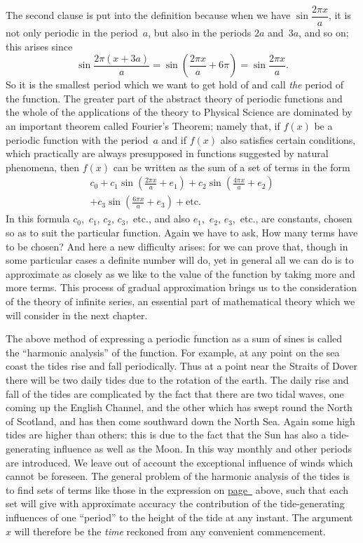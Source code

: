 \documentclass[12pt,leqno]{book}[2005/09/16]
\newcommand{\Pagelabel}[2][page]{\phantomsection\label{#1:#2}}
\newcommand{\Pageref}[2][p.]{\hyperref[page:#2]{#1~\pageref*{page:#2}}}
\newcommand{\PageSep}[1]{\ignorespaces}
\begin{document}
The second clause is put into the definition
because when we have $\sin \dfrac{2\pi x}{a}$, it is not only
periodic in the period~$a$, but also in the periods
$2a$ and~$3a$, and so on; this arises since
\[
\sin \frac{2\pi (x + 3a)}{a}
  = \sin \left(\frac{2\pi x}{a} + 6\pi\right)
  = \sin \frac{2\pi x}{a}.
\]
So it is the smallest period which we want to
get hold of and call \emph{the} period of the function.
The greater part of the abstract theory of
periodic functions and the whole of the applications
of the theory to Physical Science are
dominated by an important theorem called
Fourier's Theorem; namely that, if $f(x)$ be a
%
periodic function with the period~$a$ and if $f(x)$
also satisfies certain conditions, which practically
are always presupposed in functions suggested
by natural phenomena, then $f(x)$ can
be written as the sum of a set of terms in the
form\Pagelabel{191}
\begin{multline*}
c_{0} + c_{1} \sin \left(\frac{2\pi x}{a} + e_{1}\right)
  + c_{2} \sin \left(\frac{4\pi x}{a} + e_{2}\right) \\
  + c_{3} \sin \left(\frac{6\pi x}{a} + e_{3}\right) + \text{etc.}
\end{multline*}
\PageSep{192}
In this formula $c_{0}$,~$c_{1}$, $c_{2}$, $c_{3}$,~etc., and also
$e_{1}$,~$e_{2}$, $e_{3}$,~etc., are constants, chosen so as to
suit the particular function. Again we have
to ask, How many terms have to be chosen?
And here a new difficulty arises: for we can
prove that, though in some particular cases a
definite number will do, yet in general all we
can do is to approximate as closely as we like
to the value of the function by taking more
and more terms. This process of gradual
approximation brings us to the consideration
of the theory of infinite series, an essential
part of mathematical theory which we will
consider in the next chapter.

The above method of expressing a periodic
%
function as a sum of sines is called the ``harmonic
analysis'' of the function. For example,
at any point on the sea coast the tides
rise and fall periodically. Thus at a point
near the Straits of Dover there will be two
daily tides due to the rotation of the earth.
The daily rise and fall of the tides are complicated
by the fact that there are two tidal
waves, one coming up the English Channel,
and the other which has swept round the
North of Scotland, and has then come southward
down the North Sea. Again some high
tides are higher than others: this is due to
the fact that the Sun has also a tide-generating
influence as well as the Moon. In this way
monthly and other periods are introduced.
\PageSep{193}
We leave out of account the exceptional influence
of winds which cannot be foreseen.
The general problem of the harmonic analysis
of the tides is to find sets of terms like those
in the expression on \Pageref[page]{191} above, such that
each set will give with approximate accuracy
the contribution of the tide-generating influences
of one ``period'' to the height of the
tide at any instant. The argument~$x$ will
therefore be the \emph{time} reckoned from any convenient
commencement.
\end{document}
